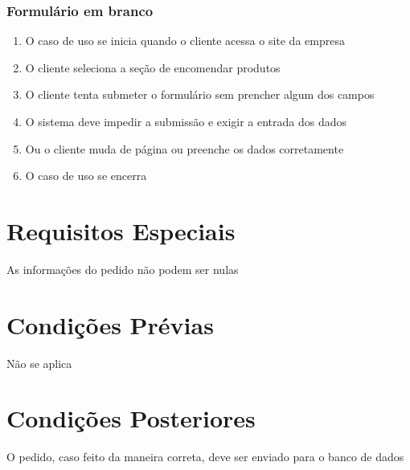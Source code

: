 \subsubsection{Formulário em branco}
\begin{enumerate}
	\item O caso de uso se inicia quando o cliente acessa o site da empresa
	\item O cliente seleciona a seção de encomendar produtos
	\item O cliente tenta submeter o formulário sem prencher algum dos campos
	\item O sistema deve impedir a submissão e exigir a entrada dos dados
	\item Ou o cliente muda de página ou preenche os dados corretamente
	\item O caso de uso se encerra
\end{enumerate}

\section{Requisitos Especiais}

As informações do pedido não podem ser nulas

\section{Condições Prévias}

Não se aplica

\section{Condições Posteriores}

O pedido, caso feito da maneira correta, deve ser enviado para o banco de dados